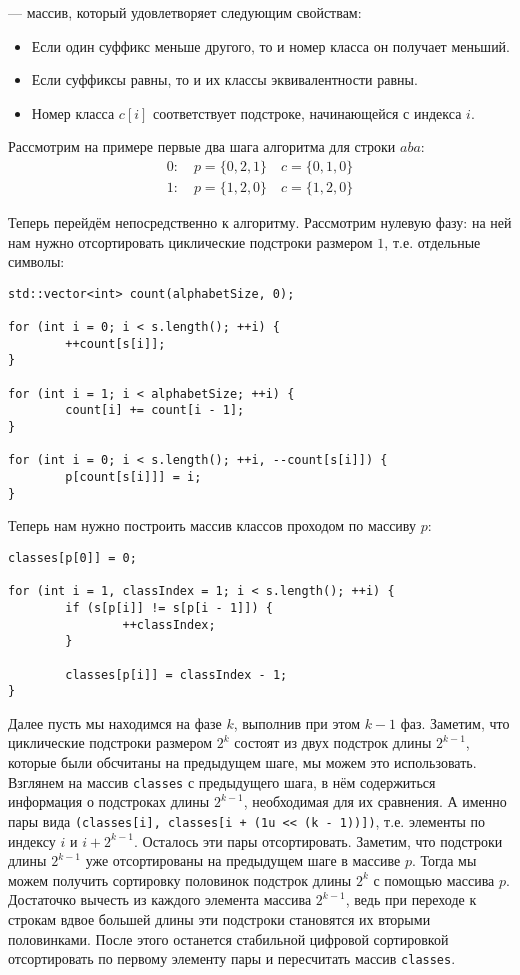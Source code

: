 \begin{definition}
         --- массив, который удовлетворяет следующим свойствам:
        \begin{itemize}
                \item Если один суффикс меньше другого, то и номер класса он получает меньший.
                \item Если суффиксы равны, то и их классы эквивалентности равны.
                \item Номер класса $c[i]$ соответствует подстроке, начинающейся с индекса $i$.
        \end{itemize}
\end{definition}

Рассмотрим на примере первые два шага алгоритма для строки $aba$:
\begin{gather*}
        0: \quad p = \{ 0, 2, 1 \} \quad c = \{ 0, 1, 0 \} \\
        1: \quad p = \{ 1, 2, 0 \} \quad c = \{ 1, 2, 0 \}
\end{gather*}

Теперь перейдём непосредственно к алгоритму. 
Рассмотрим нулевую фазу: на ней нам нужно отсортировать циклические подстроки размером $1$, т.е. отдельные
символы:
\begin{lstlisting}
std::vector<int> count(alphabetSize, 0);

for (int i = 0; i < s.length(); ++i) {
        ++count[s[i]];
}

for (int i = 1; i < alphabetSize; ++i) {
        count[i] += count[i - 1];
}

for (int i = 0; i < s.length(); ++i, --count[s[i]]) {
        p[count[s[i]]] = i;
}
\end{lstlisting}

Теперь нам нужно построить массив классов проходом по массиву $p$:
\begin{lstlisting}
classes[p[0]] = 0;

for (int i = 1, classIndex = 1; i < s.length(); ++i) {
        if (s[p[i]] != s[p[i - 1]]) {
                ++classIndex;
        }
        
        classes[p[i]] = classIndex - 1;
}
\end{lstlisting}
Далее пусть мы находимся на фазе $k$, выполнив при этом  $k-1$ фаз.
Заметим, что циклические подстроки размером  $2^{k}$ состоят из двух подстрок длины $2^{k - 1}$, которые
были обсчитаны на предыдущем шаге, мы можем это использовать. Взглянем на массив \lstinline{classes} с
предыдущего шага, в нём содержиться информация о подстроках длины $2^{k - 1}$, необходимая для их сравнения.
А именно пары вида \lstinline{(classes[i], classes[i + (1u << (k - 1))])}, 
т.е. элементы по индексу $i$ и $i + 2^{k-1}$. Осталось эти пары отсортировать. Заметим, что
подстроки длины $2^{k - 1}$ уже отсортированы на предыдущем шаге в массиве $p$.
Тогда мы можем получить сортировку половинок подстрок длины $2^{k}$ с помощью массива $p$.
Достаточко вычесть из каждого элемента массива $2^{k-1}$, ведь при переходе к строкам вдвое большей длины
эти подстроки становятся их вторыми половинками. После этого останется стабильной цифровой сортировкой
отсортировать по первому элементу пары и пересчитать массив \lstinline{classes}.

